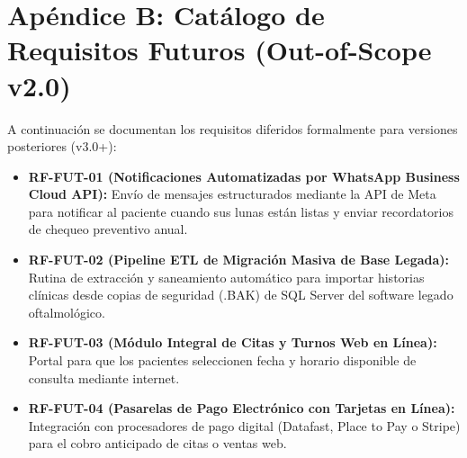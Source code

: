 \documentclass[12pt,a4paper]{report}
\begin{document}
\section*{Apéndice B: Catálogo de Requisitos Futuros (Out-of-Scope v2.0)}
A continuación se documentan los requisitos diferidos formalmente para versiones posteriores (v3.0+):
\begin{itemize}
    \item \textbf{RF-FUT-01 (Notificaciones Automatizadas por WhatsApp Business Cloud API):} Envío de mensajes estructurados mediante la API de Meta para notificar al paciente cuando sus lunas están listas y enviar recordatorios de chequeo preventivo anual.
    \item \textbf{RF-FUT-02 (Pipeline ETL de Migración Masiva de Base Legada):} Rutina de extracción y saneamiento automático para importar historias clínicas desde copias de seguridad (.BAK) de SQL Server del software legado oftalmológico.
    \item \textbf{RF-FUT-03 (Módulo Integral de Citas y Turnos Web en Línea):} Portal para que los pacientes seleccionen fecha y horario disponible de consulta mediante internet.
    \item \textbf{RF-FUT-04 (Pasarelas de Pago Electrónico con Tarjetas en Línea):} Integración con procesadores de pago digital (Datafast, Place to Pay o Stripe) para el cobro anticipado de citas o ventas web.
\end{itemize}
\end{document}
